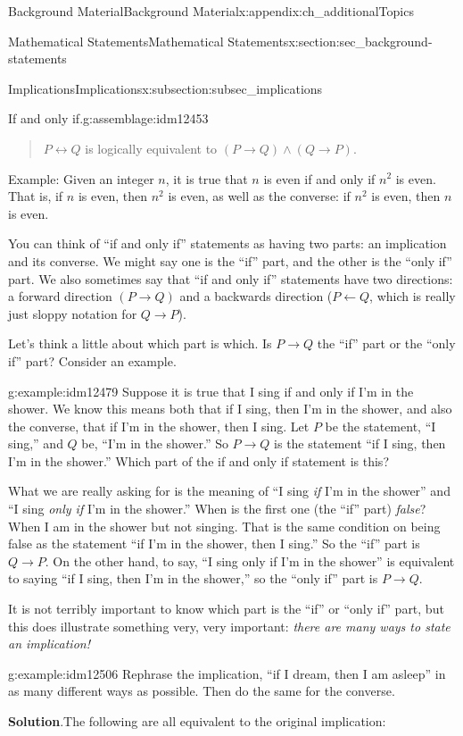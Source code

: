 \documentclass[oneside,10pt,]{book}
\numberwithin{equation}{chapter}
\def\iff{\leftrightarrow}
\def\imp{\rightarrow}
\begin{document}
\begin{appendixptx}{Background Material}{}{Background Material}{}{}{x:appendix:ch_additionalTopics}
\begin{sectionptx}{Mathematical Statements}{}{Mathematical Statements}{}{}{x:section:sec_background-statements}
\begin{subsectionptx}{Implications}{}{Implications}{}{}{x:subsection:subsec_implications}
\begin{assemblage}{If and only if.}{g:assemblage:idm12453}
\begin{quote}%
\(P \iff Q\) is logically equivalent to \((P \imp Q) \wedge (Q \imp P)\).%
\end{quote}
Example: Given an integer \(n\), it is true that \(n\) is even if and only if \(n^2\) is even. That is, if \(n\) is even, then \(n^2\) is even, as well as the converse: if \(n^2\) is even, then \(n\) is even.%
\end{assemblage}
You can think of ``if and only if'' statements as having two parts: an implication and its converse. We might say one is the ``if'' part, and the other is the ``only if'' part. We also sometimes say that ``if and only if'' statements have two directions: a forward direction \((P \imp Q)\) and a backwards direction (\(P \leftarrow Q\), which is really just sloppy notation for \(Q \imp P\)).%
\par
Let's think a little about which part is which. Is \(P \imp Q\) the ``if'' part or the ``only if'' part? Consider an example.%
\begin{example}{}{g:example:idm12479}%
Suppose it is true that I sing if and only if I'm in the shower. We know this means both that if I sing, then I'm in the shower, and also the converse, that if I'm in the shower, then I sing. Let \(P\) be the statement, ``I sing,'' and \(Q\) be, ``I'm in the shower.'' So \(P \imp Q\) is the statement ``if I sing, then I'm in the shower.'' Which part of the if and only if statement is this?%
\par
What we are really asking for is the meaning of ``I sing \emph{if} I'm in the shower'' and ``I sing \emph{only if} I'm in the shower.'' When is the first one (the ``if'' part) \emph{false}? When I am in the shower but not singing. That is the same condition on being false as the statement ``if I'm in the shower, then I sing.'' So the ``if'' part is \(Q \imp P\). On the other hand, to say, ``I sing only if I'm in the shower'' is equivalent to saying ``if I sing, then I'm in the shower,'' so the ``only if'' part is \(P \imp Q\).%
\end{example}
It is not terribly important to know which part is the ``if'' or ``only if'' part, but this does illustrate something very, very important: \emph{there are many ways to state an implication!}%
\begin{example}{}{g:example:idm12506}%
Rephrase the implication, ``if I dream, then I am asleep'' in as many different ways as possible. Then do the same for the converse.%
\par\smallskip%
\noindent\textbf{Solution}.\hypertarget{g:solution:idm12510}{}\quad{}The following are all equivalent to the original implication:%

\end{example}
\end{subsectionptx}
\end{sectionptx}
\end{appendixptx}
\end{document}

